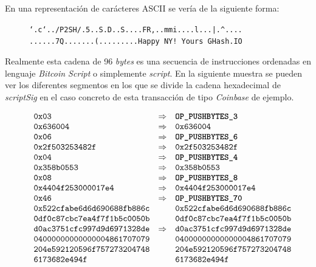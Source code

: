 \documentclass{article}
\begin{document}
    En una representación de carácteres ASCII se vería de la siguiente forma:
    \begin{figure}[H]
    \centering
        \texttt{`.c`../P2SH/.5..S.D..S....FR,..mmi....l...|.\textasciicircum....}
        \texttt{......7Q.......(.........Happy NY! Yours GHash.IO}
    \end{figure}
    
    Realmente esta cadena de 96 \textit{bytes} es una secuencia de instrucciones ordenadas en lenguaje \textit{Bitcoin Script} o simplemente \textit{script}. En la siguiente muestra se pueden ver los diferentes segmentos en los que se divide la cadena hexadecimal de \textit{scriptSig} en el caso concreto de esta transacción de tipo \textit{Coinbase} de ejemplo.
    
    \begin{figure}[H]
        $\begin{array}{lcl}
            \texttt{0x03} & \Rightarrow & \textbf{\texttt{OP\_PUSHBYTES\_3}} \\
            \texttt{0x636004} & \Rightarrow & \texttt{0x636004}\\
            \texttt{0x06} & \Rightarrow & \textbf{\texttt{OP\_PUSHBYTES\_6}} \\
            \texttt{0x2f503253482f} & \Rightarrow & \texttt{0x2f503253482f} \\
            \texttt{0x04} & \Rightarrow & \textbf{\texttt{OP\_PUSHBYTES\_4}} \\
            \texttt{0x358b0553} & \Rightarrow & \texttt{0x358b0553} \\
            \texttt{0x08} & \Rightarrow & \textbf{\texttt{OP\_PUSHBYTES\_8}} \\
            \texttt{0x4404f253000017e4} & \Rightarrow & \texttt{0x4404f253000017e4} \\
            \texttt{0x46} & \Rightarrow & \textbf{\texttt{OP\_PUSHBYTES\_70}} \\
            \texttt{0x522cfabe6d6d690688fb886c} & & \texttt{0x522cfabe6d6d690688fb886c} \\
            \texttt{0df0c87cbc7ea4f7f1b5c0050b} & & \texttt{0df0c87cbc7ea4f7f1b5c0050b} \\
            \texttt{d0ac3751cfc997d9d6971328de} & \Rightarrow & \texttt{d0ac3751cfc997d9d6971328de} \\
            \texttt{04000000000000004861707079} & & \texttt{04000000000000004861707079} \\
            \texttt{204e592120596f757273204748} & & \texttt{204e592120596f757273204748} \\
            \texttt{6173682e494f} & & \texttt{6173682e494f}
        \end{array}$
    \end{figure}
    
\end{document}
